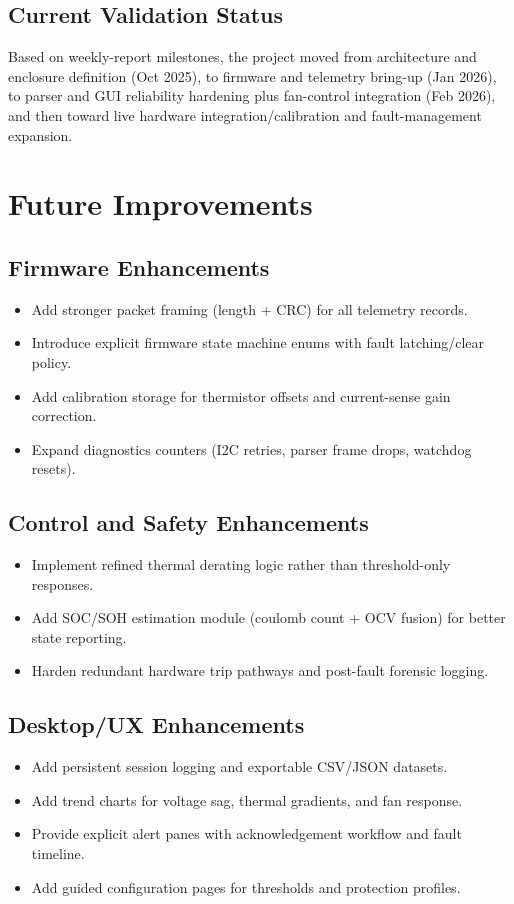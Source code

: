 \documentclass[12pt]{article}
\begin{document}
\subsection{Current Validation Status}
Based on weekly-report milestones, the project moved from architecture and enclosure definition (Oct 2025), to firmware and telemetry bring-up (Jan 2026), to parser and GUI reliability hardening plus fan-control integration (Feb 2026), and then toward live hardware integration/calibration and fault-management expansion.

\section{Future Improvements}

\subsection{Firmware Enhancements}
\begin{itemize}[leftmargin=1.2cm]
    \item Add stronger packet framing (length + CRC) for all telemetry records.
    \item Introduce explicit firmware state machine enums with fault latching/clear policy.
    \item Add calibration storage for thermistor offsets and current-sense gain correction.
    \item Expand diagnostics counters (I2C retries, parser frame drops, watchdog resets).
\end{itemize}

\subsection{Control and Safety Enhancements}
\begin{itemize}[leftmargin=1.2cm]
    \item Implement refined thermal derating logic rather than threshold-only responses.
    \item Add SOC/SOH estimation module (coulomb count + OCV fusion) for better state reporting.
    \item Harden redundant hardware trip pathways and post-fault forensic logging.
\end{itemize}

\subsection{Desktop/UX Enhancements}
\begin{itemize}[leftmargin=1.2cm]
    \item Add persistent session logging and exportable CSV/JSON datasets.
    \item Add trend charts for voltage sag, thermal gradients, and fan response.
    \item Provide explicit alert panes with acknowledgement workflow and fault timeline.
    \item Add guided configuration pages for thresholds and protection profiles.
\end{itemize}
\end{document}
